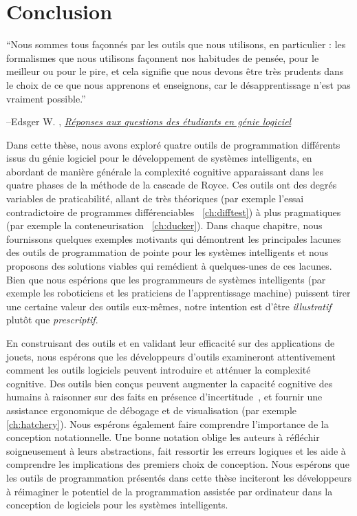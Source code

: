 \chapter{Conclusion}\label{ch:conclusion}
\setlength{\epigraphwidth}{0.90\textwidth}
\epigraph{``Nous sommes tous façonnés par les outils que nous utilisons, en particulier : les formalismes que nous utilisons façonnent nos habitudes de pensée, pour le meilleur ou pour le pire, et cela signifie que nous devons être très prudents dans le choix de ce que nous apprenons et enseignons, car le désapprentissage n'est pas vraiment possible.''}{\begin{flushright}--Edsger W. \citet{dijkstra2000answers}, \href{https://www.cs.utexas.edu/~EWD/transcriptions/EWD13xx/EWD1305.html}{\textit{Réponses aux questions des étudiants en génie logiciel}}\end{flushright}}

Dans cette thèse, nous avons exploré quatre outils de programmation différents issus du génie logiciel pour le développement de systèmes intelligents, en abordant de manière générale la complexité cognitive apparaissant dans les quatre phases de la méthode de la cascade de Royce. Ces outils ont des degrés variables de praticabilité, allant de très théoriques (par exemple l'essai contradictoire de programmes différenciables ~\autoref{ch:difftest}) à plus pragmatiques (par exemple la conteneurisation ~\autoref{ch:ducker}). Dans chaque chapitre, nous fournissons quelques exemples motivants qui démontrent les principales lacunes des outils de programmation de pointe pour les systèmes intelligents et nous proposons des solutions viables qui remédient à quelques-unes de ces lacunes. Bien que nous espérions que les programmeurs de systèmes intelligents (par exemple les roboticiens et les praticiens de l'apprentissage machine) puissent tirer une certaine valeur des outils eux-mêmes, notre intention est d'être \textit{illustratif} plutôt que \textit{prescriptif}.

En construisant des outils et en validant leur efficacité sur des applications de jouets, nous espérons que les développeurs d'outils examineront attentivement comment les outils logiciels peuvent introduire et atténuer la complexité cognitive. Des outils bien conçus peuvent augmenter la capacité cognitive des humains à raisonner sur des faits en présence d'incertitude~\citep{famelis2012partial}, et fournir une assistance ergonomique de débogage et de visualisation (par exemple \autoref{ch:hatchery}). Nous espérons également faire comprendre l'importance de la conception notationnelle. Une bonne notation oblige les auteurs à réfléchir soigneusement à leurs abstractions, fait ressortir les erreurs logiques et les aide à comprendre les implications des premiers choix de conception. Nous espérons que les outils de programmation présentés dans cette thèse inciteront les développeurs à réimaginer le potentiel de la programmation assistée par ordinateur dans la conception de logiciels pour les systèmes intelligents.

